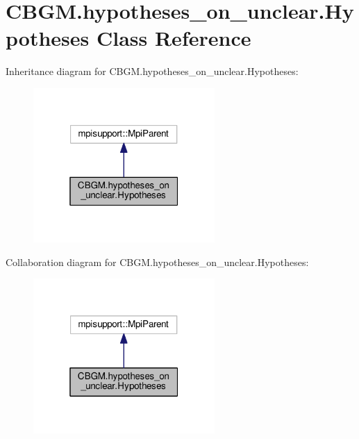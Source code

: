 \hypertarget{classCBGM_1_1hypotheses__on__unclear_1_1Hypotheses}{}\section{C\+B\+G\+M.\+hypotheses\+\_\+on\+\_\+unclear.\+Hypotheses Class Reference}
\label{classCBGM_1_1hypotheses__on__unclear_1_1Hypotheses}


Inheritance diagram for C\+B\+G\+M.\+hypotheses\+\_\+on\+\_\+unclear.\+Hypotheses\+:\nopagebreak
\begin{figure}[H]
\begin{center}
\leavevmode
\includegraphics[width=196pt]{classCBGM_1_1hypotheses__on__unclear_1_1Hypotheses__inherit__graph}
\end{center}
\end{figure}


Collaboration diagram for C\+B\+G\+M.\+hypotheses\+\_\+on\+\_\+unclear.\+Hypotheses\+:\nopagebreak
\begin{figure}[H]
\begin{center}
\leavevmode
\includegraphics[width=196pt]{classCBGM_1_1hypotheses__on__unclear_1_1Hypotheses__coll__graph}
\end{center}
\end{figure}
